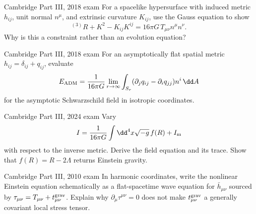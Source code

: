\begin{exercises}
\begin{exercise}{Cambridge Part III, 2018 exam}
For a spacelike hypersurface with induced metric \(h_{ij}\), unit normal
\(n^\mu\), and extrinsic curvature \(K_{ij}\), use the Gauss equation to show
\[
{}^{(3)}R+K^2-K_{ij}K^{ij}=16\pi G\,T_{\mu\nu}n^\mu n^\nu.
\]
Why is this a constraint rather than an evolution equation?
\end{exercise}

\begin{exercise}{Cambridge Part III, 2018 exam}
For an asymptotically flat spatial metric
\(h_{ij}=\delta_{ij}+q_{ij}\), evaluate
\[
E_{\rm ADM}=\frac1{16\pi G}\lim_{r\to\infty}
\int_{S_r}(\partial_jq_{ij}-\partial_iq_{jj})n^i\,\dd A
\]
for the asymptotic Schwarzschild field in isotropic coordinates.
\end{exercise}

\begin{exercise}[\(f(R)\) gravity]{Cambridge Part III, 2024 exam}
Vary
\[
I=\frac1{16\pi G}\int\dd^4x\sqrt{-g}\,f(R)+I_{\rm m}
\]
with respect to the inverse metric.  Derive the field equation and its trace.
Show that \(f(R)=R-2\Lambda\) returns Einstein gravity.
\end{exercise}

\begin{exercise}{Cambridge Part III, 2010 exam}
In harmonic coordinates, write the nonlinear Einstein equation schematically
as a flat-spacetime wave equation for \(\bar h_{\mu\nu}\) sourced by
\(\tau_{\mu\nu}=T_{\mu\nu}+t_{\mu\nu}^{\rm grav}\).  Explain why
\(\partial_\mu\tau^{\mu\nu}=0\) does not make
\(t_{\mu\nu}^{\rm grav}\) a generally covariant local stress tensor.
\end{exercise}



\end{exercises}

